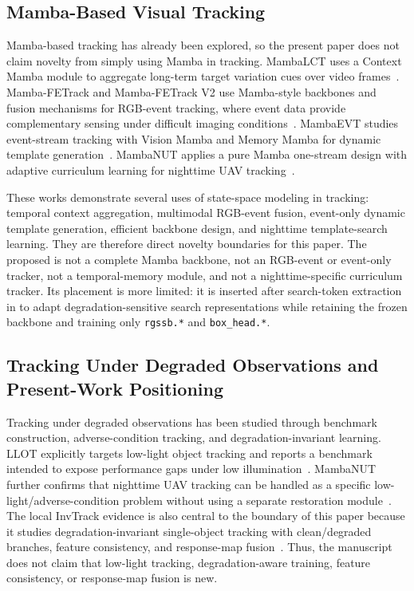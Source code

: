 \subsection{Mamba-Based Visual Tracking}
Mamba-based tracking has already been explored, so the present paper does not claim novelty from simply using Mamba in tracking. MambaLCT uses a Context Mamba module to aggregate long-term target variation cues over video frames~\cite{li2024mambalct}. Mamba-FETrack and Mamba-FETrack V2 use Mamba-style backbones and fusion mechanisms for RGB-event tracking, where event data provide complementary sensing under difficult imaging conditions~\cite{huang2024mambafetrack,wang2025mambafetrackv2}. MambaEVT studies event-stream tracking with Vision Mamba and Memory Mamba for dynamic template generation~\cite{wang2024mambaevt}. MambaNUT applies a pure Mamba one-stream design with adaptive curriculum learning for nighttime UAV tracking~\cite{wu2024mambanut}.

These works demonstrate several uses of state-space modeling in tracking: temporal context aggregation, multimodal RGB-event fusion, event-only dynamic template generation, efficient backbone design, and nighttime template-search learning. They are therefore direct novelty boundaries for this paper. The proposed \method{} is not a complete Mamba backbone, not an RGB-event or event-only tracker, not a temporal-memory module, and not a nighttime-specific curriculum tracker. Its placement is more limited: it is inserted after search-token extraction in \baseline{} to adapt degradation-sensitive search representations while retaining the frozen backbone and training only \texttt{rgssb.*} and \texttt{box\_head.*}.

\subsection{Tracking Under Degraded Observations and Present-Work Positioning}
Tracking under degraded observations has been studied through benchmark construction, adverse-condition tracking, and degradation-invariant learning. LLOT explicitly targets low-light object tracking and reports a benchmark intended to expose performance gaps under low illumination~\cite{zhong2024llot}. MambaNUT further confirms that nighttime UAV tracking can be handled as a specific low-light/adverse-condition problem without using a separate restoration module~\cite{wu2024mambanut}. The local InvTrack evidence is also central to the boundary of this paper because it studies degradation-invariant single-object tracking with clean/degraded branches, feature consistency, and response-map fusion~\cite{invtrack_local}. Thus, the manuscript does not claim that low-light tracking, degradation-aware training, feature consistency, or response-map fusion is new.


